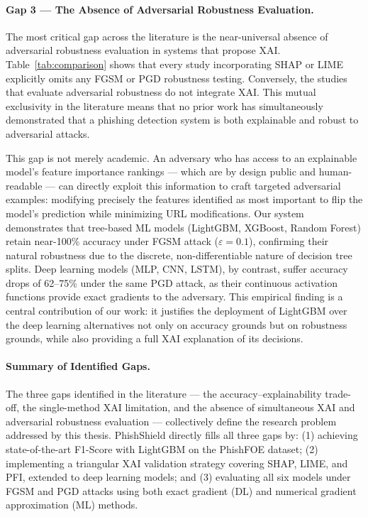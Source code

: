 \paragraph{Gap 3 — The Absence of Adversarial Robustness Evaluation.}
The most critical gap across the literature is the near-universal absence of adversarial robustness evaluation in systems that propose XAI. Table~\ref{tab:comparison} shows that every study incorporating SHAP or LIME explicitly omits any FGSM or PGD robustness testing. Conversely, the studies that evaluate adversarial robustness do not integrate XAI. This mutual exclusivity in the literature means that no prior work has simultaneously demonstrated that a phishing detection system is both explainable and robust to adversarial attacks.

This gap is not merely academic. An adversary who has access to an explainable model's feature importance rankings — which are by design public and human-readable — can directly exploit this information to craft targeted adversarial examples: modifying precisely the features identified as most important to flip the model's prediction while minimizing URL modifications. Our system demonstrates that tree-based ML models (LightGBM, XGBoost, Random Forest) retain near-100\% accuracy under FGSM attack ($\varepsilon = 0.1$), confirming their natural robustness due to the discrete, non-differentiable nature of decision tree splits. Deep learning models (MLP, CNN, LSTM), by contrast, suffer accuracy drops of 62--75\% under the same PGD attack, as their continuous activation functions provide exact gradients to the adversary. This empirical finding is a central contribution of our work: it justifies the deployment of LightGBM over the deep learning alternatives not only on accuracy grounds but on robustness grounds, while also providing a full XAI explanation of its decisions.

\paragraph{Summary of Identified Gaps.}
The three gaps identified in the literature — the accuracy–explainability trade-off, the single-method XAI limitation, and the absence of simultaneous XAI and adversarial robustness evaluation — collectively define the research problem addressed by this thesis. PhishShield directly fills all three gaps by: (1) achieving state-of-the-art F1-Score with LightGBM on the PhishFOE dataset; (2) implementing a triangular XAI validation strategy covering SHAP, LIME, and PFI, extended to deep learning models; and (3) evaluating all six models under FGSM and PGD attacks using both exact gradient (DL) and numerical gradient approximation (ML) methods.

